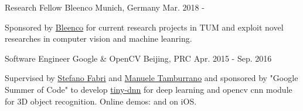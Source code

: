 


\begin{cventries}


\cventry
{Research Fellow} %
{Bleenco} %
{Munich, Germany} %
{Mar. 2018 - } %
{ %
\begin{cvitems}
\item {Sponsored by \href{https://www.linkedin.com/in/irmanabdic/?originalSubdomain=de}{Bleenco} for current research projects in TUM and exploit novel researches in computer vision and machine leanring.}
\end{cvitems}
}

\cventry
{Software Engineer} %
{Google \& OpenCV} %
{Beijing, PRC} %
{Apr. 2015 - Sep. 2016} %
{ %
\begin{cvitems}
\item {Supervised by \href{https://www.linkedin.com/in/stefano-fabri-16a73748}{Stefano Fabri} and \href{https://www.linkedin.com/in/manuele-tamburrano-b82384a5?authType=name&authToken=Di5p&trk=prof-sb-browse_map-name}{Manuele Tamburrano} and sponsored by "Google Summer of Code" to develop \href{https://github.com/tiny-dnn/tiny-dnn}{tiny-dnn} for deep learning and opencv cnn module for 3D object recognition.
		Online demos: \href{https://www.youtube.com/watch?v=Mc20rTYdXTE}{} and \href{https://drive.google.com/open?id=0B-RYa1FDOrYXVUEzcG1mdnl5a3M}{} on iOS.
}
\end{cvitems}
}


\end{cventries}
